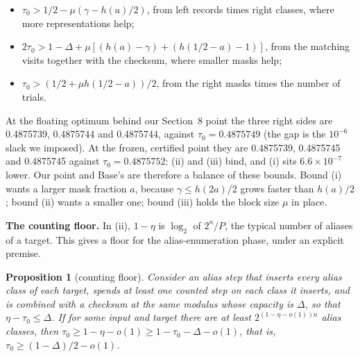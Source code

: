 \documentclass[11pt]{article}
\theoremstyle{plain}
\newtheorem{proposition}{Proposition}
\begin{document}
\begin{itemize}
\item[(i)] $\tau_0 > 1/2 - \mu(\gamma - h(a)/2)$, from left records times right classes, where more representations help;
\item[(ii)] $2\tau_0 > 1 - \Delta + \mu[(h(a) - \gamma) + (h(1/2 - a) - 1)]$, from the matching visits together with the checksum, where smaller masks help;
\item[(iii)] $\tau_0 > (1/2 + \mu h(1/2 - a))/2$, from the right masks times the number of trials.
\end{itemize}

At the floating optimum behind our Section~8 point the three right sides are 0.4875739, 0.4875744 and 0.4875744, against $\tau_0 = 0.4875749$ (the gap is the $10^{-6}$ slack we imposed). At the frozen, certified point they are 0.4875739, 0.4875745 and 0.4875745 against $\tau_0 = 0.4875752$: (ii) and (iii) bind, and (i) sits $6.6\times10^{-7}$ lower. Our point and Base's are therefore a balance of these bounds. Bound (i) wants a larger mask fraction $a$, because $\gamma \le h(2a)/2$ grows faster than $h(a)/2$; bound (ii) wants a smaller one; bound (iii) holds the block size $\mu$ in place.

\textbf{The counting floor.} In (ii), $1 - \eta$ is $\log_2$ of $2^n/P$, the typical number of aliases of a target. This gives a floor for the alias-enumeration phase, under an explicit premise.

\begin{proposition}[counting floor]\label{prop:floor}
Consider an alias step that inserts every alias class of each target, spends at least one counted step on each class it inserts, and is combined with a checksum at the same modulus whose capacity is $\Delta$, so that $\eta - \tau_0 \le \Delta$. If for some input and target there are at least $2^{(1-\eta-o(1))n}$ alias classes, then $\tau_0 \ge 1 - \eta - o(1) \ge 1 - \tau_0 - \Delta - o(1)$, that is, $\tau_0 \ge (1-\Delta)/2 - o(1)$.
\end{proposition}
\end{document}
